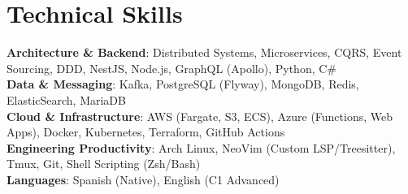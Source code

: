 \documentclass[letterpaper,11pt]{article}
\begin{document}
\section{Technical Skills}
 \begin{itemize}[leftmargin=0.15in, labelsep=0.15in]
    \small{\item{
     \textbf{Architecture \& Backend}{: Distributed Systems, Microservices, CQRS, Event Sourcing, DDD, NestJS, Node.js, GraphQL (Apollo), Python, C\#} \\
     \textbf{Data \& Messaging}{: Kafka, PostgreSQL (Flyway), MongoDB, Redis, ElasticSearch, MariaDB} \\
     \textbf{Cloud \& Infrastructure}{: AWS (Fargate, S3, ECS), Azure (Functions, Web Apps), Docker, Kubernetes, Terraform, GitHub Actions} \\
     \textbf{Engineering Productivity}{: Arch Linux, NeoVim (Custom LSP/Treesitter), Tmux, Git, Shell Scripting (Zsh/Bash)} \\
     \textbf{Languages}{: Spanish (Native), English (C1 Advanced)}
    }}
 \end{itemize}

\end{document}
